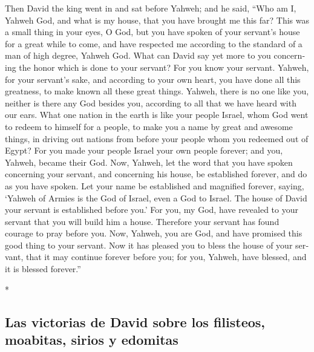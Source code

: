 \begin{paracol}{2}
\begin{otherlanguage}{english}
 Then David the king went in and sat before Yahweh; and
he said, ``Who am I, Yahweh God, and what is my house, that you have
brought me this far?  This was a small thing in your
eyes, O God, but you have spoken of your servant's house for a great
while to come, and have respected me according to the standard of a man
of high degree, Yahweh God.  What can David say yet more
to you concerning the honor which is done to your servant? For you know
your servant.  Yahweh, for your servant's sake, and
according to your own heart, you have done all this greatness, to make
known all these great things.  Yahweh, there is no one
like you, neither is there any God besides you, according to all that we
have heard with our ears.  What one nation in the earth
is like your people Israel, whom God went to redeem to himself for a
people, to make you a name by great and awesome things, in driving out
nations from before your people whom you redeemed out of Egypt?
 For you made your people Israel your own people forever;
and you, Yahweh, became their God.  Now, Yahweh, let the
word that you have spoken concerning your servant, and concerning his
house, be established forever, and do as you have spoken.
 Let your name be established and magnified forever,
saying, `Yahweh of Armies is the God of Israel, even a God to Israel.
The house of David your servant is established before you.'
 For you, my God, have revealed to your servant that you
will build him a house. Therefore your servant has found courage to pray
before you.  Now, Yahweh, you are God, and have promised
this good thing to your servant.  Now it has pleased you
to bless the house of your servant, that it may continue forever before
you; for you, Yahweh, have blessed, and it is blessed forever.''

\end{otherlanguage}

\switchcolumn[0]*

\hypertarget{las-victorias-de-david-sobre-los-filisteos-moabitas-sirios-y-edomitas}{%
\subsection{Las victorias de David sobre los filisteos, moabitas, sirios
y
edomitas}\label{las-victorias-de-david-sobre-los-filisteos-moabitas-sirios-y-edomitas}}

\hypertarget{section-34}{%
}
\end{paracol}
